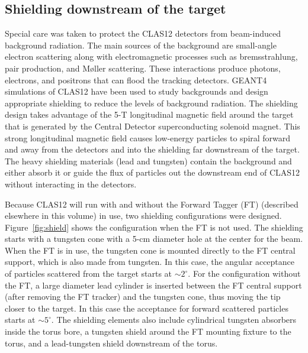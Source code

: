 \subsection{Shielding downstream of the target} 

Special care was taken to protect the CLAS12 detectors from beam-induced background radiation. The main sources of the background are 
small-angle electron scattering along with electromagnetic processes such as bremsstrahlung, pair production, and M{\o}ller scattering. 
These interactions produce photons, electrons, and positrons that can flood the tracking detectors. GEANT4 simulations of CLAS12
have been used to study backgrounds and design appropriate shielding to reduce the levels of background radiation.  The shielding design
takes advantage of the 5-T longitudinal magnetic field around the target that is generated by the Central Detector superconducting solenoid 
magnet. This strong longitudinal magnetic field causes low-energy particles to spiral forward and away from the detectors and into the 
shielding far downstream of the target. The heavy shielding materials (lead and tungsten) contain the background and either absorb it or 
guide the flux of particles out the downstream end of CLAS12 without interacting in the detectors. 

Because CLAS12 will run with and without the Forward Tagger (FT) (described elsewhere in this volume) in use, two shielding 
configurations were designed. Figure~\ref{fig:shield} shows the configuration when the FT is not used. The shielding starts with a 
tungsten cone with a 5-cm diameter hole at the center for the beam. When the FT is in use, the tungsten cone is mounted directly 
to the FT central support, which is also made from tungsten. In this case, the angular acceptance of particles scattered from the target 
starts at $\sim 2^\circ$. For the configuration without the FT, a large diameter lead cylinder is inserted between the FT central support 
(after removing the FT tracker) and the tungsten cone, thus moving the tip closer to the target. In this case the acceptance for forward 
scattered particles starts at $\sim 5^\circ$. The shielding elements also include cylindrical tungsten absorbers inside the torus bore, a 
tungsten shield around the FT mounting fixture to the torus, and a lead-tungsten shield downstream of the torus.  

